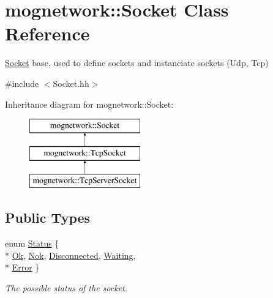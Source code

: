 \hypertarget{classmognetwork_1_1_socket}{\section{mognetwork\-:\-:Socket Class Reference}
\label{classmognetwork_1_1_socket}
}


\hyperlink{classmognetwork_1_1_socket}{Socket} base, used to define sockets and instanciate sockets (Udp, Tcp)  




{\ttfamily \#include $<$Socket.\-hh$>$}

Inheritance diagram for mognetwork\-:\-:Socket\-:\begin{figure}[H]
\begin{center}
\leavevmode
\includegraphics[height=3.000000cm]{classmognetwork_1_1_socket}
\end{center}
\end{figure}
\subsection*{Public Types}
\begin{DoxyCompactItemize}
\item 
enum \hyperlink{classmognetwork_1_1_socket_aa187a8394ac0d6203af0ec7f021ca15f}{Status} \{ \\*
\hyperlink{classmognetwork_1_1_socket_aa187a8394ac0d6203af0ec7f021ca15fa1a76bb652d4c1fdb64829e97b7062a7b}{Ok}, 
\hyperlink{classmognetwork_1_1_socket_aa187a8394ac0d6203af0ec7f021ca15fa088ded708dfc87053ea73283b18929b5}{Nok}, 
\hyperlink{classmognetwork_1_1_socket_aa187a8394ac0d6203af0ec7f021ca15fa76cee46670ca9c26209aaf48ba12a6ea}{Disconnected}, 
\hyperlink{classmognetwork_1_1_socket_aa187a8394ac0d6203af0ec7f021ca15fa73f0c13cec39a68a4896b33c916d551c}{Waiting}, 
\\*
\hyperlink{classmognetwork_1_1_socket_aa187a8394ac0d6203af0ec7f021ca15fae82858abe36f6f41dde52bea32212238}{Error}
 \}
\begin{DoxyCompactList}\small\item\em The possible status of the socket. \end{DoxyCompactList}\end{DoxyCompactItemize}
